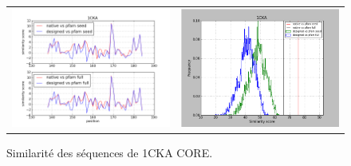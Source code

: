 \documentclass[a4paper,12pt]{article}
\begin{document}
   \begin{figure}[t]
     \centering
     \begin{tabular}{cc}
       \includegraphics[width=8.45cm]{sedano_gen2/graph_simil_bypos.png} &
       \includegraphics[width=8.45cm]{sedano_gen2/graph_simil_byseq.png} \\


     \end{tabular}

     \caption{Similarité des séquences de 1CKA CORE.}

   \end{figure}
\end{document}
